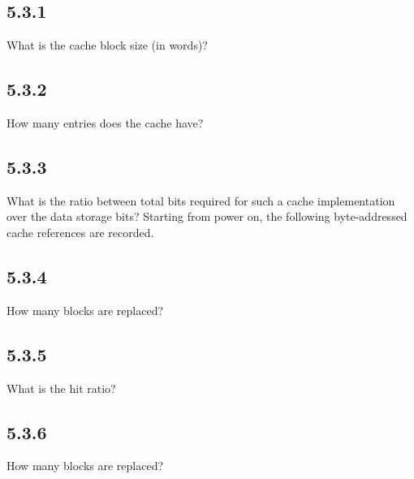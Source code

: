 \documentclass[paper=a4, fontsize=11pt]{scrartcl} %
\begin{document}
\subsection{5.3.1} %
\label{sub:5_3_1}
\begin{fancyquotes}
    What is the cache block size (in words)?
\end{fancyquotes}


\subsection{5.3.2} %
\label{sub:5_3_2}
\begin{fancyquotes}
    How many entries does the cache have?
\end{fancyquotes}


\subsection{5.3.3} %
\label{sub:5_3_3}
\begin{fancyquotes}
    What is the ratio between total bits required for such a cache implementation over the data storage bits?
    Starting from power on, the following byte-addressed cache references are recorded.
\end{fancyquotes}


\subsection{5.3.4} %
\label{sub:5_3_4}
\begin{fancyquotes}
    How many blocks are replaced?
\end{fancyquotes}


\subsection{5.3.5} %
\label{sub:5_3_5}
\begin{fancyquotes}
    What is the hit ratio?
\end{fancyquotes}


\subsection{5.3.6} %
\label{sub:5_3_6}
\begin{fancyquotes}
    How many blocks are replaced?
\end{fancyquotes}

\end{document}
